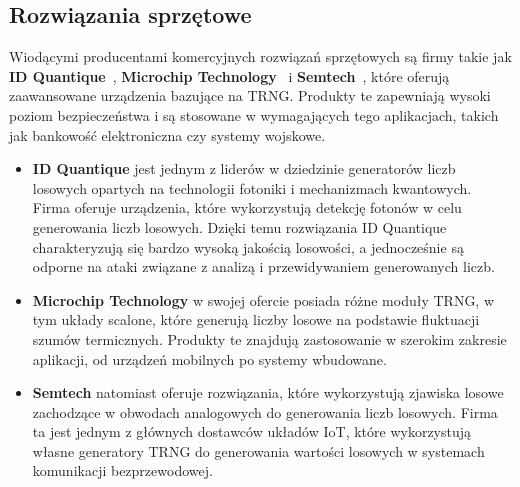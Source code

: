 \subsection{Rozwiązania sprzętowe}\label{subsec:rozwiazania-sprzetowe}
Wiodącymi producentami komercyjnych rozwiązań sprzętowych są firmy takie jak
\textbf{ID Quantique}~\cite{IDQ}, \textbf{Microchip Technology}~\cite{MicrochipTechnology} i \textbf{Semtech}~\cite{Semtech},
które oferują zaawansowane urządzenia bazujące na TRNG.
Produkty te zapewniają wysoki poziom bezpieczeństwa i są stosowane w wymagających tego aplikacjach,
takich jak bankowość elektroniczna czy systemy wojskowe.

\begin{itemize}
    \item \textbf{ID Quantique} jest jednym z liderów w dziedzinie generatorów liczb losowych opartych na technologii fotoniki i mechanizmach kwantowych.
     Firma oferuje urządzenia, które wykorzystują detekcję fotonów w celu generowania liczb losowych.
     Dzięki temu rozwiązania ID Quantique charakteryzują się bardzo wysoką jakością losowości,
     a jednocześnie są odporne na ataki związane z analizą i przewidywaniem generowanych liczb.

    \item \textbf{Microchip Technology} w swojej ofercie posiada różne moduły TRNG, w tym układy scalone,
     które generują liczby losowe na podstawie fluktuacji szumów termicznych.
    Produkty te znajdują zastosowanie w szerokim zakresie aplikacji, od urządzeń mobilnych po systemy wbudowane.

    \item \textbf{Semtech} natomiast oferuje rozwiązania, które wykorzystują zjawiska losowe
     zachodzące w obwodach analogowych do generowania liczb losowych.
     Firma ta jest jednym z głównych dostawców układów IoT, które wykorzystują własne generatory TRNG
     do generowania wartości losowych w systemach komunikacji bezprzewodowej.
\end{itemize}


